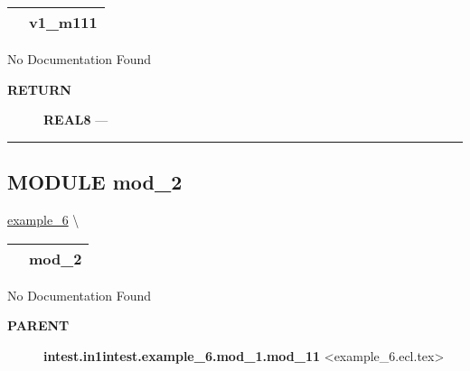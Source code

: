 {\renewcommand{\arraystretch}{1.5}
\begin{tabularx}{\textwidth}{|>{\raggedright\arraybackslash}l|X|}
\hline
\hspace{0pt}\mytexttt{\color{red} } & \textbf{v1\_m111} \\
\hline
\end{tabularx}
}

\par





No Documentation Found








\par
\begin{description}
\item [\colorbox{tagtype}{\color{white} \textbf{\textsf{RETURN}}}] \textbf{REAL8} --- 
\end{description}




\rule{\linewidth}{0.5pt}






\subsection*{\textsf{\colorbox{headtoc}{\color{white} MODULE}
mod\_2}}

\hypertarget{ecldoc:intest.in1intest.example_6.mod_2}{}
\hspace{0pt} \hyperlink{ecldoc:intest.in1intest.example_6}{example_6} \textbackslash 

{\renewcommand{\arraystretch}{1.5}
\begin{tabularx}{\textwidth}{|>{\raggedright\arraybackslash}l|X|}
\hline
\hspace{0pt}\mytexttt{\color{red} } & \textbf{mod\_2} \\
\hline
\end{tabularx}
}

\par





No Documentation Found










\par
\begin{description}
\item [\colorbox{tagtype}{\color{white} \textbf{\textsf{PARENT}}}] \textbf{intest.in1intest.example\_6.mod\_1.mod\_11} <example\_6.ecl.tex>
\end{description}



